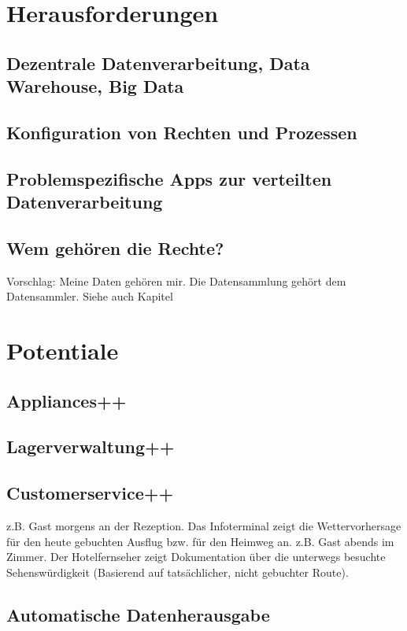 \section{Herausforderungen}
\label{sec:herausforderungen}

\subsection{Dezentrale Datenverarbeitung, Data Warehouse, Big Data}
\subsection{Konfiguration von Rechten und Prozessen}
\subsection{Problemspezifische Apps zur verteilten Datenverarbeitung}
\subsection{Wem gehören die Rechte?}

Vorschlag: Meine Daten gehören mir. Die Datensammlung gehört dem Datensammler.
Siehe auch Kapitel~

\section{Potentiale}
\label{sec:potentiale}

\subsection{Appliances++}
\subsection{Lagerverwaltung++}
\subsection{Customerservice++}

z.B. Gast morgens an der Rezeption. Das Infoterminal zeigt die Wettervorhersage für den heute gebuchten Ausflug bzw. für den Heimweg an.
z.B. Gast abends im Zimmer. Der Hotelfernseher zeigt Dokumentation über die unterwegs besuchte Sehenswürdigkeit (Basierend auf tatsächlicher, nicht gebuchter Route).

\subsection{Automatische Datenherausgabe}
\label{sec:autogathering}

